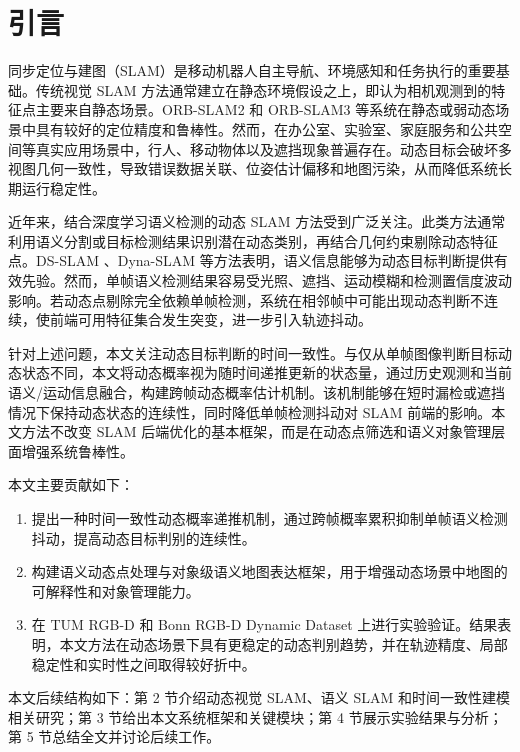\section{引言}

同步定位与建图（SLAM）是移动机器人自主导航、环境感知和任务执行的重要基础。传统视觉 SLAM 方法通常建立在静态环境假设之上，即认为相机观测到的特征点主要来自静态场景。ORB-SLAM2 \citep{mur2017orb} 和 ORB-SLAM3 \citep{campos2021orb} 等系统在静态或弱动态场景中具有较好的定位精度和鲁棒性。然而，在办公室、实验室、家庭服务和公共空间等真实应用场景中，行人、移动物体以及遮挡现象普遍存在。动态目标会破坏多视图几何一致性，导致错误数据关联、位姿估计偏移和地图污染，从而降低系统长期运行稳定性。

近年来，结合深度学习语义检测的动态 SLAM 方法受到广泛关注。此类方法通常利用语义分割或目标检测结果识别潜在动态类别，再结合几何约束剔除动态特征点。DS-SLAM \citep{yu2018ds}、Dyna-SLAM \citep{bescos2018dynaslam} 等方法表明，语义信息能够为动态目标判断提供有效先验。然而，单帧语义检测结果容易受光照、遮挡、运动模糊和检测置信度波动影响。若动态点剔除完全依赖单帧检测，系统在相邻帧中可能出现动态判断不连续，使前端可用特征集合发生突变，进一步引入轨迹抖动。

针对上述问题，本文关注动态目标判断的时间一致性。与仅从单帧图像判断目标动态状态不同，本文将动态概率视为随时间递推更新的状态量，通过历史观测和当前语义/运动信息融合，构建跨帧动态概率估计机制。该机制能够在短时漏检或遮挡情况下保持动态状态的连续性，同时降低单帧检测抖动对 SLAM 前端的影响。本文方法不改变 SLAM 后端优化的基本框架，而是在动态点筛选和语义对象管理层面增强系统鲁棒性。

本文主要贡献如下：
\begin{enumerate}
    \item 提出一种时间一致性动态概率递推机制，通过跨帧概率累积抑制单帧语义检测抖动，提高动态目标判别的连续性。
    \item 构建语义动态点处理与对象级语义地图表达框架，用于增强动态场景中地图的可解释性和对象管理能力。
    \item 在 TUM RGB-D 和 Bonn RGB-D Dynamic Dataset 上进行实验验证。结果表明，本文方法在动态场景下具有更稳定的动态判别趋势，并在轨迹精度、局部稳定性和实时性之间取得较好折中。
\end{enumerate}

本文后续结构如下：第 2 节介绍动态视觉 SLAM、语义 SLAM 和时间一致性建模相关研究；第 3 节给出本文系统框架和关键模块；第 4 节展示实验结果与分析；第 5 节总结全文并讨论后续工作。

